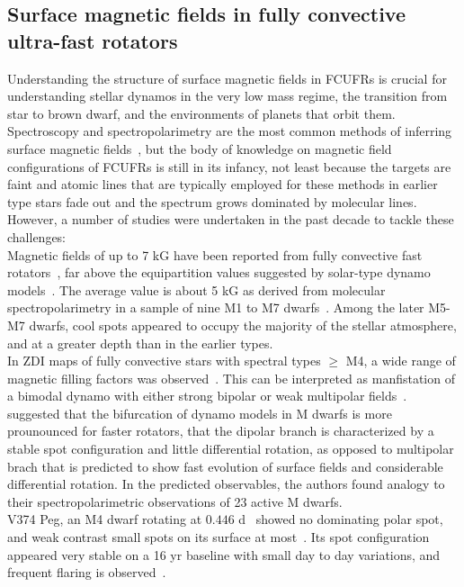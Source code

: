 \documentclass[fleqn,usenatbib,letters]{mnras}%
\begin{document}
\subsection{Surface magnetic fields in fully convective ultra-fast rotators}
Understanding the structure of surface magnetic fields in FCUFRs is crucial for understanding stellar dynamos in the very low mass regime, the transition from star to brown dwarf, and the environments of planets that orbit them. Spectroscopy and spectropolarimetry are the most common methods of inferring surface magnetic fields~\citep{donati2009}, but the body of knowledge on magnetic field configurations of FCUFRs is still in its infancy, not least because the targets are faint and atomic lines that are typically employed for these methods in earlier type stars fade out and the spectrum grows dominated by molecular lines. 
\\
However, a number of studies were undertaken in the past decade to tackle these challenges:
\\
Magnetic fields of up to 7 kG have been reported from fully convective fast rotators~\citep{shulyak2017}, far above the equipartition values suggested by solar-type dynamo models~\citep{pevtsov2003}. The average value is about 5 kG as derived from molecular spectropolarimetry in a sample of nine M1 to M7 dwarfs~\citep{afram2019}. Among the later M5-M7 dwarfs, cool spots appeared to occupy the majority of the stellar atmosphere, and at a greater depth than in the earlier types.  
\\
In ZDI maps of fully convective stars with spectral types $\geq$ M4, a wide range of magnetic filling factors was observed~\citep{see2019}. This can be interpreted as manfistation of a bimodal dynamo with either strong bipolar or weak multipolar fields~\citep{morin2010}. \citet{gastine2013} suggested that the bifurcation of dynamo models in M dwarfs is more prounounced for faster rotators, that the dipolar branch is characterized by a stable spot configuration and little differential rotation, as opposed to multipolar brach that is predicted to show fast evolution of surface fields and considerable differential rotation. In the predicted observables, the authors found analogy to their spectropolarimetric observations of 23 active M dwarfs.
\\
V374 Peg, an M4 dwarf rotating at $0.446$ d~\citep{newton2016} showed no dominating polar spot, and weak contrast small spots on its surface at most~\citep{morin2008peg}. Its spot configuration appeared very stable on a 16 yr baseline with small day to day variations, and frequent flaring is observed~\citep{vida2016}.
\end{document}
